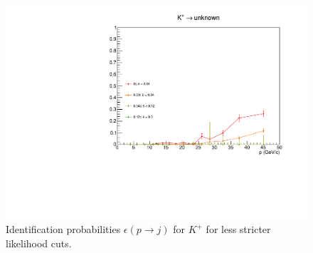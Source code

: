 \begin{figure}[!p]
  \includegraphics[scale=0.38]{./gfx/Kp_u_less.pdf}
	\caption{Identification probabilities $\epsilon(p \rightarrow j)$ for $K^+$ for less stricter likelihood cuts.}
	\label{pic:Effkpless}
\end{figure}

